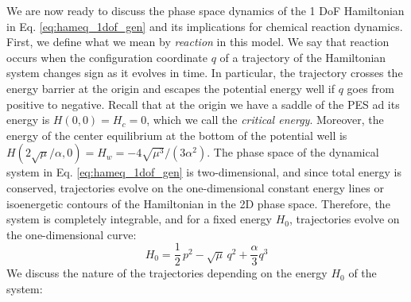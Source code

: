 \documentclass[8pt]{article}
\begin{document}
We are now ready to discuss the phase space dynamics of the 1 DoF Hamiltonian in Eq. \eqref{eq:hameq_1dof_gen} and its implications for chemical reaction dynamics. First, we define what we mean by \textit{reaction} in this model. We say that reaction occurs when the configuration coordinate $q$ of a trajectory of the Hamiltonian system changes sign as it evolves in time. In particular, the trajectory crosses the energy barrier at the origin and escapes the potential energy well if $q$ goes from positive to negative. Recall that at the origin we have a saddle of the PES ad its energy is $H(0,0) = H_c = 0$, which we call the \textit{critical energy}. Moreover, the energy of the center equilibrium at the  bottom of the potential well is $H(2\sqrt{\mu}/\alpha,0) = H_w = - 4 \sqrt{\mu^3}/(3 \alpha^2)$. The phase space of the dynamical system in Eq. \eqref{eq:hameq_1dof_gen} is two-dimensional, and since total energy is conserved, trajectories evolve on the one-dimensional constant energy lines or isoenergetic contours of the Hamiltonian in the 2D phase space. Therefore, the system is completely integrable, and for a fixed energy $H_0$, trajectories evolve on the one-dimensional curve:
\begin{equation}
H_0 = \frac{1}{2} \, p^2 - \sqrt{\mu} \, q^2 + \frac{\alpha}{3} q^3
\end{equation}
We discuss the nature of the trajectories depending on the energy $H_0$ of the system:
\end{document}

